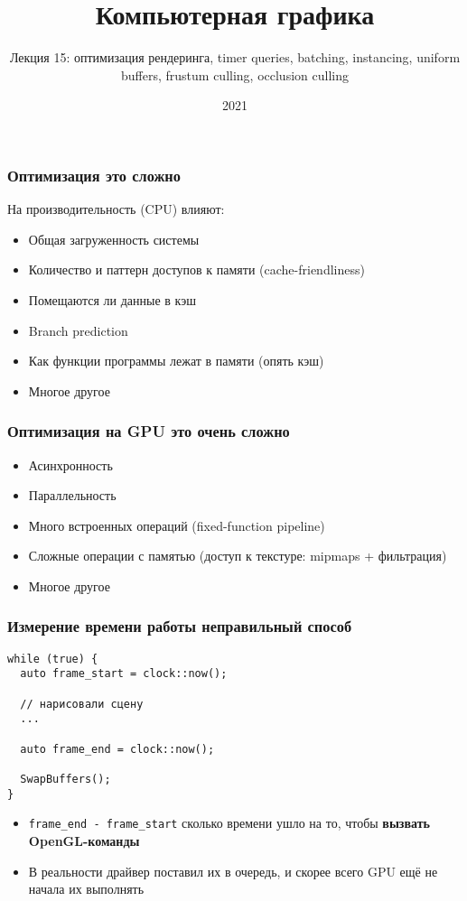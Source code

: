 \documentclass{beamer}
\title{Компьютерная графика}
\subtitle{Лекция 15: оптимизация рендеринга, timer queries, batching, instancing, uniform buffers, frustum culling, occlusion culling}
\date{2021}
\begin{document}
\frame{\titlepage}

\begin{frame}[fragile]
\frametitle{Оптимизация \textendash{} это сложно}
На производительность (CPU) влияют:
\pause
\begin{itemize}
\item Общая загруженность системы
\pause
\item Количество и паттерн доступов к памяти (cache-friendliness)
\pause
\item Помещаются ли данные в кэш
\pause
\item Branch prediction
\pause
\item Как функции программы лежат в памяти (опять кэш)
\pause
\item Многое другое
\end{itemize}
\end{frame}

\begin{frame}[fragile]
\frametitle{Оптимизация на GPU \textendash{} это очень сложно}
\begin{itemize}
\item Асинхронность
\pause
\item Параллельность
\pause
\item Много встроенных операций (fixed-function pipeline)
\pause
\item Сложные операции с памятью (доступ к текстуре: mipmaps + фильтрация)
\pause
\item Многое другое
\end{itemize}
\end{frame}

\begin{frame}[fragile]
\frametitle{Измерение времени работы \textendash{} неправильный способ}
\begin{verbatim}
while (true) {
  auto frame_start = clock::now();

  // нарисовали сцену
  ...

  auto frame_end = clock::now();

  SwapBuffers();
}
\end{verbatim}
\pause
\begin{itemize}
\item \verb|frame_end - frame_start| \textendash{} сколько времени ушло на то, чтобы \textbf{вызвать OpenGL-команды}
\pause
\item В реальности драйвер поставил их в очередь, и скорее всего GPU ещё не начала их выполнять
\end{itemize}
\end{frame}
\end{document}
